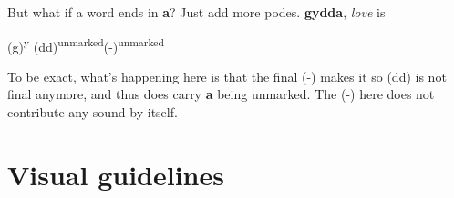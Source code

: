 \documentclass[10pt,oneside]{memoir}
\begin{document}
But what if a word ends in \textbf{a}? Just add more podes. \textbf{gydda}, \emph{love} is

\begin{center}
    \Large (g)\textsuperscript{y} (dd)\textsuperscript{unmarked}(-)\textsuperscript{unmarked}
\end{center}

To be exact, what's happening here is that the final (-) makes it so (dd) is not final anymore, and thus does carry \textbf{a} being unmarked. The (-) here does not contribute any sound by itself.

\section{Visual guidelines}

\vfill
\end{document}
